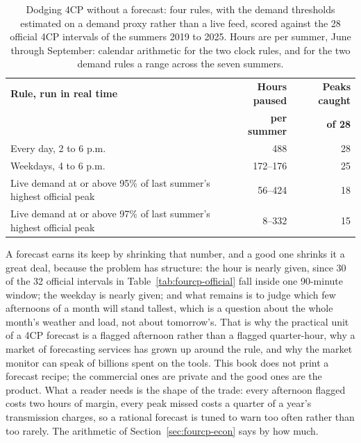 \begin{table}[htbp]
  \centering
  \footnotesize
  \setlength{\tabcolsep}{4pt}
  \begin{tabular}{p{5.3cm}rr}
    \hline
    \textbf{Rule, run in real time} & \textbf{Hours paused} & \textbf{Peaks caught} \\
     & \textbf{per summer} & \textbf{of 28} \\
    \hline
    Every day, 2 to 6 p.m. & 488 & 28 \\
    Weekdays, 4 to 6 p.m. & 172--176 & 25 \\
    Live demand at or above 95\% of last summer's highest official peak & 56--424 & 18 \\
    Live demand at or above 97\% of last summer's highest official peak & 8--332 & 15 \\
    \hline
  \end{tabular}
  \caption{Dodging 4CP without a forecast: four rules, with the demand thresholds estimated on a demand proxy rather than a live feed, scored against the 28 official 4CP intervals of the summers 2019 to 2025. Hours are per summer, June through September: calendar arithmetic for the two clock rules, and for the two demand rules a range across the seven summers.} %
  \label{tab:fourcp-rules}
\end{table}

A forecast earns its keep by shrinking that number, and a good one shrinks it a great deal, because the problem has structure: the hour is nearly given, since 30 of the 32 official intervals in Table~\ref{tab:fourcp-official} fall inside one 90-minute window; the weekday is nearly given; and what remains is to judge which few afternoons of a month will stand tallest, which is a question about the whole month's weather and load, not about tomorrow's. %
That is why the practical unit of a 4CP forecast is a flagged afternoon rather than a flagged quarter-hour, why a market of forecasting services has grown up around the rule, and why the market monitor can speak of billions spent on the tools. This book does not print a forecast recipe; the commercial ones are private and the good ones are the product. What a reader needs is the shape of the trade: every afternoon flagged costs two hours of margin, every peak missed costs a quarter of a year's transmission charges, so a rational forecast is tuned to warn too often rather than too rarely. The arithmetic of Section~\ref{sec:fourcp-econ} says by how much.

